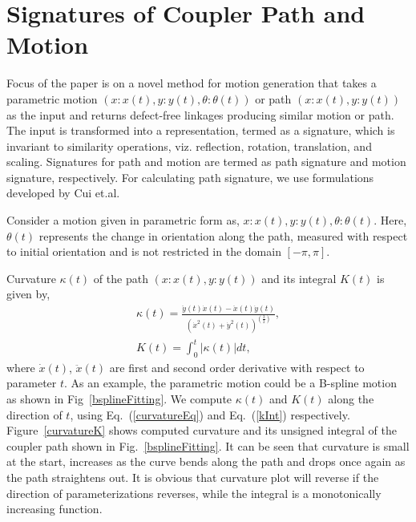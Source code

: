 \documentclass[twocolumn,10pt]{asme2e}
\newcommand{\req}[1]{(\ref{#1})}
\begin{document}
\section{Signatures of Coupler Path and Motion}\label{sec_sign}
Focus of the paper is on a novel method for motion generation that takes a parametric motion $(x:x(t), y:y(t), \theta:\theta(t))$ or path $(x:x(t), y:y(t))$ as the input and returns defect-free linkages producing similar motion or path.
The input is transformed into a representation, termed as a signature, which is invariant to similarity operations, viz. reflection, rotation, translation, and scaling.
Signatures for path and motion are termed as path signature and motion signature, respectively.
For calculating path signature, we use formulations developed by Cui et.al\cite{cui2009}.

Consider a motion given in parametric form as, $x:x(t), y:y(t), \theta:\theta(t)$.
Here, $\theta(t)$ represents the change in orientation along the path, measured with respect to initial orientation and is not restricted in the domain $[-\pi, \pi]$.

Curvature $\kappa(t)$ of the path $(x:x(t), y:y(t))$ and its integral $K(t)$ is given by,
\begin{eqnarray}
  \kappa(t) = \frac{\ddot{y}(t)\dot{x}(t) - \ddot{x}(t)\dot{y}(t)}{{(\dot{x}^2(t) + \dot{y}^2(t))}^{(\frac 32)}}, \label{curvatureEq}\\
  K(t) = \int^{t}_0 |\kappa(t)|dt \label{kInt},
\end{eqnarray}
where $\dot{x}(t)$, $\ddot{x}(t)$ are first and second order derivative with respect to parameter $t$.
As an example, the parametric motion could be a B-spline motion as shown in Fig~\ref{bsplineFitting}.
We compute $\kappa(t)$ and $K(t)$ along the direction of $t$, using Eq.~\req{curvatureEq} and Eq.~\req{kInt} respectively.
Figure~\ref{curvatureK} shows computed curvature and its unsigned integral of the coupler path shown in Fig.~\ref{bsplineFitting}.
It can be seen that curvature is small at the start, increases as the curve bends along the path and drops once again as the path straightens out. It is obvious that curvature plot will reverse if the direction of parameterizations reverses, while the integral is a monotonically increasing function.
\end{document}
